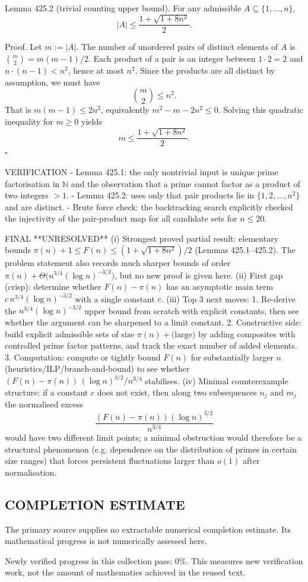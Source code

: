 Lemma 425.2 (trivial counting upper bound).
For any admissible $A\subseteq\{1,\dots,n\}$,
\[
|A|\le \frac{1+\sqrt{1+8n^2}}{2}.
\]

Proof.
Let $m:=|A|$. The number of unordered pairs of distinct elements of $A$ is $\binom{m}{2}=m(m-1)/2$.
Each product of a pair is an integer between $1\cdot 2=2$ and $n\cdot (n-1)<n^2$, hence at most $n^2$.
Since the products are all distinct by assumption, we must have
\[
\binom{m}{2}\le n^2.
\]
That is $m(m-1)\le 2n^2$, equivalently $m^2-m-2n^2\le 0$.
Solving this quadratic inequality for $m\ge 0$ yields
\[
 m\le \frac{1+\sqrt{1+8n^2}}{2}.
\]
\hfill $\square$

VERIFICATION
- Lemma 425.1: the only nontrivial input is unique prime factorisation in $\mathbb N$ and the observation that a prime cannot factor as a product of two integers $>1$.
- Lemma 425.2: uses only that pair products lie in $\{1,2,\dots,n^2\}$ and are distinct.
- Brute force check: the backtracking search explicitly checked the injectivity of the pair-product map for all candidate sets for $n\le 20$.

FINAL
**UNRESOLVED**
(i) Strongest proved partial result: elementary bounds $\pi(n)+1\le F(n)\le (1+\sqrt{1+8n^2})/2$ (Lemmas 425.1–425.2). The problem statement also records much sharper bounds of order $\pi(n)+\Theta\bigl(n^{3/4}(\log n)^{-3/2}\bigr)$, but no new proof is given here.
(ii) First gap (crisp): determine whether $F(n)-\pi(n)$ has an asymptotic main term $c\,n^{3/4}(\log n)^{-3/2}$ with a single constant $c$.
(iii) Top 3 next moves:
  1. Re-derive the $n^{3/4}(\log n)^{-3/2}$ upper bound from scratch with explicit constants, then see whether the argument can be sharpened to a limit constant.
  2. Constructive side: build explicit admissible sets of size $\pi(n)+\text{(large)}$ by adding composites with controlled prime factor patterns, and track the exact number of added elements.
  3. Computation: compute or tightly bound $F(n)$ for substantially larger $n$ (heuristics/ILP/branch-and-bound) to see whether $(F(n)-\pi(n))\,(\log n)^{3/2}/n^{3/4}$ stabilises.
(iv) Minimal counterexample structure: if a constant $c$ does not exist, then along two subsequences $n_j$ and $m_j$ the normalised excess
\[
\frac{(F(n)-\pi(n))(\log n)^{3/2}}{n^{3/4}}
\]
would have two different limit points; a minimal obstruction would therefore be a structural phenomenon (e.g. dependence on the distribution of primes in certain size ranges) that forces persistent fluctuations larger than $o(1)$ after normalisation.




\subsection*{COMPLETION ESTIMATE}
The primary source supplies no extractable numerical completion estimate. Its mathematical progress is not numerically assessed here.

Newly verified progress in this collection pass: $0\%$. This measures new verification work, not the amount of mathematics achieved in the reused text.
